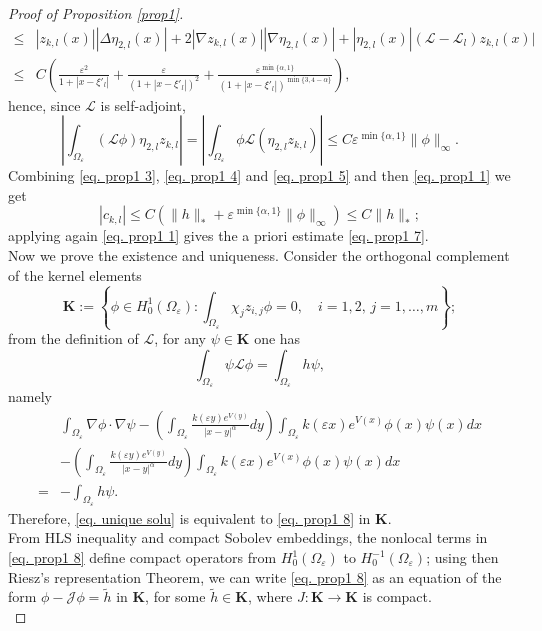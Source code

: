 \documentclass[11pt]{article}
\begin{document}
\begin{proof}[Proof of Proposition \ref{prop1}]
\begin{align*}
\le&|z_{k,l}(x)||\Delta\eta_{2,l}(x)|+2|\nabla z_{k,l}(x)||\nabla\eta_{2,l}(x)|+|\eta_{2,l}(x)|(\mathcal L-\mathcal L_l)z_{k,l}(x)|\\
\le&C\left(\frac{\varepsilon^2}{1+\left|x-\xi'_l\right|}+\frac\varepsilon{\left(1+\left|x-\xi'_l\right|\right)^2}+\frac{\varepsilon^{\min\{\alpha,1\}}}{\left(1+\left|x-\xi'_l\right|\right)^{\min\{3,4-\alpha\}}}\right),
\end{align*}
hence, since $\mathcal L$ is self-adjoint,
\begin{equation}\label{eq. prop1 5}
\left|\int_{\Omega_\varepsilon}(\mathcal L\phi)\eta_{2,l}z_{k,l}\right|=\left|\int_{\Omega_\varepsilon}\phi\mathcal L(\eta_{2,l}z_{k,l})\right|\le C\varepsilon^{\min\{\alpha,1\}}\|\phi\|_\infty.
\end{equation}
Combining \eqref{eq. prop1 3}, \eqref{eq. prop1 4} and \eqref{eq. prop1 5} and then \eqref{eq. prop1 1} we get
\begin{equation}\label{ckl}
|c_{k,l}|\le C\left(\|h\|_\ast+\varepsilon^{\min\{\alpha,1\}}\|\phi\|_\infty \right)\le C\|h\|_\ast;
\end{equation}
applying again \eqref{eq. prop1 1} gives the a priori estimate \eqref{eq. prop1 7}.\\
Now we prove the existence and uniqueness. Consider the orthogonal complement of the kernel elements
\begin{equation}\label{k}
\mathbf K:=\left\{\phi\in H^1_0(\Omega_\varepsilon):\int_{\Omega_\varepsilon}\chi_jz_{i,j}\phi=0,\quad i=1,2,\,j=1,\dots,m\right\};
\end{equation}
from the definition of $\mathcal L$, for any $\psi\in\mathbf K$ one has
$$\int_{\Omega_\varepsilon}\psi\mathcal L\phi=\int_{\Omega_\varepsilon}h\psi,$$
namely
\begin{align}\label{eq. prop1 8}
\nonumber&\int_{\Omega_\varepsilon}\nabla\phi\cdot\nabla\psi-\left(\int_{\Omega_\varepsilon}\frac{k(\varepsilon y)e^{V(y)}}{|x-y|^\alpha}dy\right)\int_{\Omega_\varepsilon}k(\varepsilon x)e^{V(x)}\phi(x)\psi(x)dx\\
\nonumber&-\left(\int_{\Omega_\varepsilon}\frac{k(\varepsilon y)e^{V(y)}}{|x-y|^\alpha}dy\right)\int_{\Omega_\varepsilon}k(\varepsilon x)e^{V(x)}\phi(x)\psi(x)dx\\
=&-\int_{\Omega_\varepsilon}h\psi.
\end{align}
Therefore, \eqref{eq. unique solu} is equivalent to \eqref{eq. prop1 8} in $\mathbf K$.\\
From HLS inequality and compact Sobolev embeddings, the nonlocal terms in \eqref{eq. prop1 8} define compact operators from $H^1_0(\Omega_\varepsilon)$ to $H^{-1}_0(\Omega_\varepsilon)$; using then Riesz's representation Theorem, we can write \eqref{eq. prop1 8} as an equation of the form $\phi-\mathcal J\phi=\widetilde h$ in $\mathbf K$, for some $\widetilde h\in\mathbf K$, where $J:\mathbf K\to\mathbf K$ is compact.\\

\end{proof}
\end{document}
